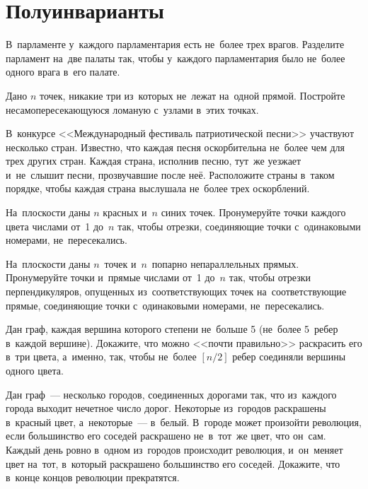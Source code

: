 

\section*{Полуинварианты}


\begin{problems}

\item
В~парламенте у~каждого парламентария есть не~более трех врагов.
Разделите парламент на~две палаты так, чтобы у~каждого парламентария было
не~более одного врага в~его палате.

\item
Дано $n$ точек, никакие три из~которых не~лежат на~одной прямой.
Постройте несамопересекающуюся ломаную с~узлами в~этих точках.

\item
В~конкурсе <<Международный фестиваль патриотической песни>> участвуют несколько
стран.
Известно, что каждая песня оскорбительна не~более чем для трех других стран.
Каждая страна, исполнив песню, тут~же уезжает и~не~слышит песни, прозвучавшие
после неё.
Расположите страны в~таком порядке, чтобы каждая страна выслушала не~более трех
оскорблений.

\item
На~плоскости даны $n$ красных и~$n$ синих точек.
Пронумеруйте точки каждого цвета числами от~1 до~$n$ так, чтобы отрезки,
соединяющие точки с~одинаковыми номерами, не~пересекались.

\item
На~плоскости даны $n$~точек и~$n$~попарно непараллельных прямых.
Пронумеруйте точки и~прямые числами от~1 до~$n$ так, чтобы отрезки
перпендикуляров, опущенных из~соответствующих точек на~соответствующие прямые,
соединяющие точки с~одинаковыми номерами, не~пересекались.

\item
Дан граф, каждая вершина которого степени не~больше 5 (не~более 5~ребер
в~каждой вершине).
Докажите, что можно <<почти правильно>> раскрасить его в~три цвета, а~именно,
так, чтобы не~более $[n / 2]$ ребер соединяли вершины одного цвета.

\item
Дан граф~--- несколько городов, соединенных дорогами так, что из~каждого города
выходит нечетное число дорог.
Некоторые из~городов раскрашены в~красный цвет, а~некоторые~--- в~белый.
В~городе может произойти революция, если большинство его соседей раскрашено
не~в~тот~же цвет, что он~сам.
Каждый день ровно в~одном из~городов происходит революция, и~он~меняет цвет
на~тот, в~который раскрашено большинство его соседей.
Докажите, что в~конце концов революции прекратятся.


\end{problems}
